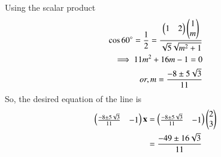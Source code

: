 Using the scalar product
\begin{align}
  \cos{60\degree}=
\frac{1}{2}=\frac{\begin{pmatrix}
        1&2
    \end{pmatrix}\begin{pmatrix}
        1\\m
    \end{pmatrix}}{\sqrt{5}\sqrt{m^2+1}}\\
\implies 11m^2+16m-1=0\\
   or, m=\frac{-8\pm5\sqrt{3}}{11}    
\end{align}
So, the desired equation of the line is
\begin{align}
\begin{pmatrix}
    \frac{-8\pm5\sqrt{3}}{11}&-1
\end{pmatrix}\mathbf{x} 
	&=
\begin{pmatrix}
    \frac{-8\pm5\sqrt{3}}{11}&-1
\end{pmatrix}
\begin{pmatrix}
    2\\3\end{pmatrix}
    \\
	&=\frac{-49\pm16\sqrt{3}}{11}
\end{align}


